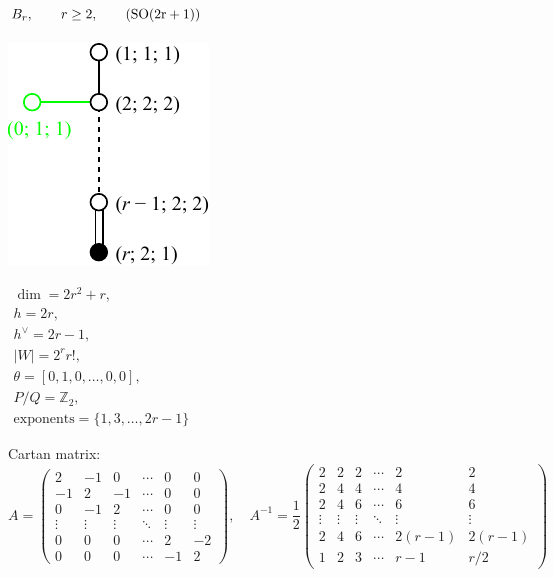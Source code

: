 \documentclass[12pt]{article}
\newcommand{\Zb}{\mathbb{Z}}
\newcommand{\SO}{\rm SO}
\newcommand{\hc}{h^{\vee}}
\begin{document}
\newpage
%
\subsection*{$B_r,\qquad r\ge 2,\qquad (\SO(2r+1))$}
\parbox{8cm}{\includegraphics{lie_B.pdf}}
$
\begin{array}{l}
 \dim = 2r^2+r, \\
  h= 2 r,\\
 \hc= 2 r-1,\\
 |W|=2^r r!,\\
 \theta=[0,1,0,\dots,0,0],\\
 P/Q=\Zb_2,\\
 \text{exponents}={\{1,3,\dots,2r-1\}}
\end{array}
$

Cartan matrix:
\[
A=\left(
\begin{array}{cccccc}
 2 & -1& 0 &\cdots & 0 & 0 \\
 -1& 2 & -1 &\cdots & 0 & 0 \\
 0 & -1 & 2 &\cdots & 0 & 0 \\
  \vdots&\vdots &\vdots &\ddots &\vdots &\vdots \\
 0&0 &0 &\cdots & 2& -2\\
 0&0 &0 &\cdots & -1& 2
\end{array}
\right),\quad
A^{-1}=\frac{1}{2}
\left(
\begin{array}{cccccc}
 2& 2& 2 &\cdots & 2 & 2 \\
 2& 4 & 4 &\cdots & 4 & 4 \\
 2& 4 & 6 &\cdots & 6 & 6 \\
  \vdots&\vdots &\vdots &\ddots &\vdots &\vdots \\
 2&4 &6 &\cdots & 2(r-1)& 2(r-1)\\
 1&2 &3 &\cdots & r-1& r/2
\end{array}
\right)
\]
\end{document}
